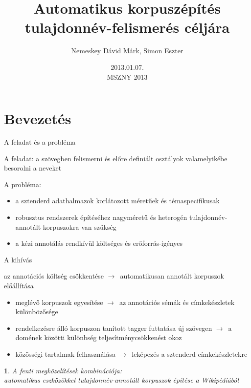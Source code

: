 \documentclass[utf8x,t]{beamer}
\title %
{Automatikus korpuszépítés tulajdonnév-felismerés céljára}
\author %
{Nemeskey Dávid Márk\inst{1}, Simon Eszter\inst{2}}
\institute{\inst{1} MTA SZTAKI \\
\inst{2} MTA Nyelvtudományi Intézet} %
\date %
{2013.01.07. \\ MSZNY 2013}
\newcommand{\nyil}{$\rightarrow$\ }
\newtheorem{nix}{}[section]
\begin{document}
\begin{frame}{}
  \titlepage
\end{frame}

\section{Bevezetés}

\begin{frame}{A feladat és a probléma}

\bigskip

A feladat: a szövegben felismerni és előre definiált osztályok valamelyikébe besorolni a neveket 

\bigskip

A probléma:
\begin{itemize}
\item a sztenderd adathalmazok korlátozott méretűek és témaspecifikusak 
\item robusztus rendszerek építéséhez nagyméretű és heterogén tulajdonnév-annotált korpuszokra van szükség
\item a kézi annotálás rendkívül költséges és erőforrás-igényes
\end{itemize}

\end{frame}

\begin{frame}{A kihívás}

az annotációs költség csökkentése \nyil automatikusan annotált korpuszok előállítása

\begin{itemize}
\item meglévő korpuszok egyesítése \nyil az annotációs sémák és címkekészletek különbözősége 
\item rendelkezésre álló korpuszon tanított tagger futtatása új szövegen \nyil a domének közötti különbség teljesítménycsökkenést okoz
\item közösségi tartalmak felhasználása \nyil leképezés a sztenderd címkekészletekre
\end{itemize}

\smallskip

\begin{nix}
A fenti megközelítések kombinációja: \\ automatikus eszközökkel tulajdonnév-annotált korpuszok építése a Wikipédiából
\end{nix}

\end{frame}
\end{document}
